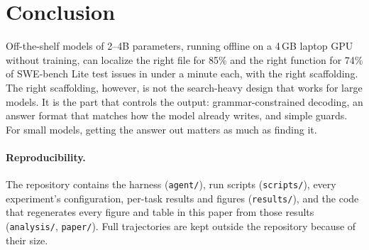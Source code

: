 \documentclass[11pt]{article}
\begin{document}
\section{Conclusion}
Off-the-shelf models of 2--4B parameters, running offline on a 4\,GB laptop GPU without training, can localize the right file for 85\% and the right function for 74\% of SWE-bench Lite test issues in under a minute each, with the right scaffolding.
The right scaffolding, however, is not the search-heavy design that works for large models.
It is the part that controls the output: grammar-constrained decoding, an answer format that matches how the model already writes, and simple guards.
For small models, getting the answer out matters as much as finding it.

\paragraph{Reproducibility.}
The repository contains the harness (\texttt{agent/}), run scripts (\texttt{scripts/}), every experiment's configuration, per-task results and figures (\texttt{results/}), and the code that regenerates every figure and table in this paper from those results (\texttt{analysis/}, \texttt{paper/}). Full trajectories are kept outside the repository because of their size.
\end{document}
